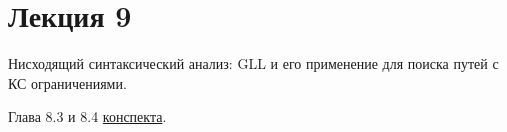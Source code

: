 \section{Лекция 9}
 
Нисходящий синтаксический анализ: GLL и его применение для поиска путей с КС ограничениями.


Глава 8.3 и 8.4 \href{https://github.com/YaccConstructor/articles/blob/master/InProgress/Formal_langs_CFPQ_course_notes/Formal_lang_CFPQ_course_notes.pdf}{конспекта}.
